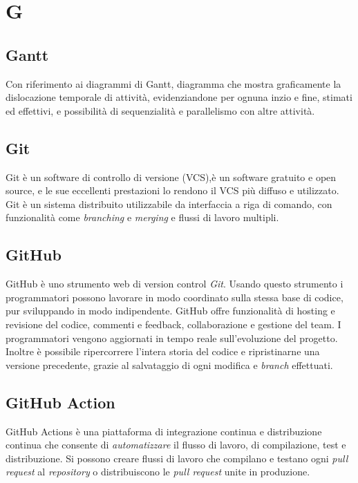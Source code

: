 \chapter{G}

\section{Gantt}
Con riferimento ai diagrammi di Gantt, diagramma che mostra graficamente la dislocazione temporale di attività, evidenziandone per ognuna inzio e fine, stimati ed effettivi, e possibilità di sequenzialità e parallelismo con altre attività.

\section{Git}
Git è un software di controllo di versione (VCS),è un software gratuito e open source, e le sue eccellenti prestazioni lo rendono il VCS più diffuso e utilizzato.
Git è un sistema distribuito utilizzabile da interfaccia a riga di comando, con funzionalità come \emph{branching} e \emph{merging} e flussi di lavoro multipli.

\section{GitHub}
GitHub è uno strumento web di version control \emph{Git}. Usando questo strumento i programmatori possono lavorare in modo coordinato sulla stessa base di codice, pur sviluppando in modo indipendente.
GitHub offre funzionalità di hosting e revisione del codice, commenti e feedback, collaborazione e gestione del team. I programmatori vengono aggiornati in tempo reale sull'evoluzione del progetto. Inoltre è possibile ripercorrere l'intera storia del codice e ripristinarne una versione precedente, grazie al salvataggio di ogni modifica e \emph{branch} effettuati.

\section{GitHub Action}
GitHub Actions è una piattaforma di integrazione continua e distribuzione continua che consente di \emph{automatizzare} il flusso di lavoro, di compilazione, test e distribuzione. Si possono creare flussi di lavoro che compilano e testano ogni \emph{pull request} al \emph{repository} o distribuiscono le \emph{pull request} unite in produzione.

